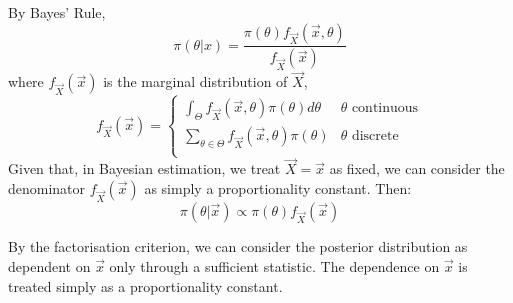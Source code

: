 \documentclass[../Main.tex]{subfiles}
\begin{document}
By Bayes' Rule,
\begin{equation*}
    \pi(\theta | x) = \frac{\pi(\theta) f_{\vec{X}}(\vec{x}, \theta)}{f_{\vec{X}}(\vec{x})}
\end{equation*}
where $f_{\vec{X}}(\vec{x})$ is the marginal distribution of $\vec{X}$,
\begin{equation*}
    f_{\vec{X}}(\vec{x}) =
    \begin{cases}
        \int_\Theta f_{\vec{X}} (\vec{x}, \theta) \pi(\theta) d\theta & \text{$\theta$ continuous} \\
        \sum_{\theta \in \Theta} f_{\vec{X}} (\vec{x}, \theta) \pi(\theta) & \text{$\theta$ discrete} \\
    \end{cases}
\end{equation*}
Given that, in Bayesian estimation, we treat $\vec{X} = \vec{x}$ as fixed, we can consider the denominator $f_{\vec{X}}(\vec{x})$ as simply a proportionality constant. Then:
\begin{equation}
    \pi(\theta | \vec{x}) \propto \pi(\theta) f_{\vec{X}}(\vec{x})
    \label{eqnBayesDists}
\end{equation}
\begin{remark}
    By the factorisation criterion, we can consider the posterior distribution as dependent on $\vec{x}$ only through a sufficient statistic. The dependence on $\vec{x}$ is treated simply as a proportionality constant.
\end{remark}
\end{document}
